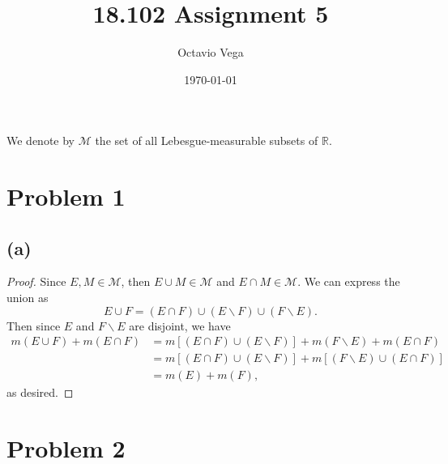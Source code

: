 \documentclass{article}
\title{18.102 Assignment 5}
\author{Octavio Vega}
\date\today
\newcommand{\R}{\mathbb{R}} %
\newcommand{\M}{\mathcal{M}} %
\begin{document}
\maketitle

We denote by $\M$ the set of all Lebesgue-measurable subsets of $\R$.

\section*{Problem 1}
\subsection*{(a)}
\begin{proof}
	Since $E, M \in \M$, then $E \cup M \in \M$ and $E \cap M \in \M$. We can express the union as 
	\begin{equation}
		E \cup F = (E \cap F) \cup (E \backslash F) \cup (F \backslash E).
	\end{equation}
	Then since $E$ and $F \backslash E$ are disjoint, we have
	\begin{align}
		m(E \cup F) + m(E \cap F) &= m\left[(E \cap F) \cup (E \backslash F)\right] + m(F \backslash E) + m(E \cap F) \\
		&= m\left[(E \cap F) \cup (E \backslash F)\right] + m\left[(F \backslash E) \cup (E \cap F)\right] \\
		&= m(E) + m(F),
	\end{align}
	as desired.	
\end{proof}
\section*{Problem 2}
\end{document}
